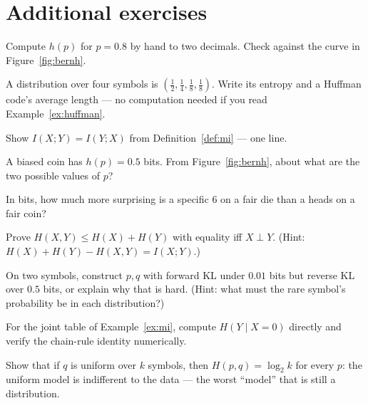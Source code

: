 \section*{Additional exercises}

\begin{exercise}[easy]
Compute $h(p)$ for $p=0.8$ by hand to two decimals. Check against the
curve in Figure~\ref{fig:bernh}.
\end{exercise}

\begin{exercise}[easy]
A distribution over four symbols is $(\tfrac12,\tfrac14,\tfrac18,
\tfrac18)$. Write its entropy and a Huffman code's average length ---
no computation needed if you read Example~\ref{ex:huffman}.
\end{exercise}

\begin{exercise}[easy]
Show $I(X;Y)=I(Y;X)$ from Definition~\ref{def:mi} --- one line.
\end{exercise}

\begin{exercise}[easy]
A biased coin has $h(p)=0.5$ bits. From Figure~\ref{fig:bernh}, about
what are the two possible values of $p$?
\end{exercise}

\begin{exercise}[easy]
In bits, how much more surprising is a specific 6 on a fair die than a
heads on a fair coin?
\end{exercise}

\begin{exercise}[medium]
Prove $H(X,Y)\le H(X)+H(Y)$ with equality iff $X\perp Y$. (Hint:
$H(X)+H(Y)-H(X,Y)=I(X;Y)$.)
\end{exercise}

\begin{exercise}[medium]
On two symbols, construct $p,q$ with forward KL under $0.01$ bits but
reverse KL over $0.5$ bits, or explain why that is hard. (Hint: what
must the rare symbol's probability be in each distribution?)
\end{exercise}

\begin{exercise}[medium]
For the joint table of Example~\ref{ex:mi}, compute $H(Y\mid X=0)$
directly and verify the chain-rule identity numerically.
\end{exercise}

\begin{exercise}[medium]
Show that if $q$ is uniform over $k$ symbols, then
$H(p,q)=\log_2 k$ for every $p$: the uniform model is indifferent to
the data --- the worst ``model'' that is still a distribution.
\end{exercise}

